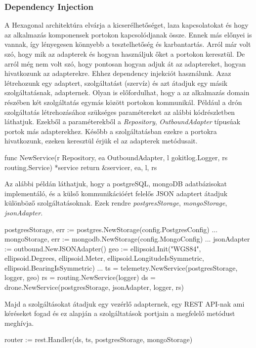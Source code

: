 \subsubsection{Dependency Injection}
A Hexagonal architektúra elvárja a kicserélhetőséget, laza kapcsolatokat és hogy az alkalmazás komponensek portokon kapcsolódjanak össze.
Ennek más előnyei is vannak, így lényegesen könnyebb a tesztelhetőség és karbantartás.
Arról már volt szó, hogy mik az adapterek és hogyan használjuk őket a portokon keresztül.
De arról még nem volt szó, hogy pontosan hogyan adjuk át az adaptereket, hogyan hivatkozunk az adapterekre.
Ehhez dependency injekciót használunk.
Azaz létrehozunk egy adaptert, szolgáltatást (szervíz) és azt átadjuk egy másik szolgáltatásnak, adapternek.
Olyan is előfordulhat, hogy a az alkalmazás domain részében két szolgáltatás egymás között portokon kommunikál.
Például a drón szolgáltatás létrehozásához szükséges paramétereket az alábbi kódrészletben láthatjuk.
Ezekből a paraméterekből a \textit{Repository}, \textit{OutboundAdapter} típusúak portok más adapterekhez.
Később a szolgáltatásban ezekre a portokra hivatkozunk, ezeken keresztül érjük el az adapterek metódusait.

\begin{python}
    func NewService(r Repository, ea OutboundAdapter, l gokitlog.Logger, rs routing.Service) *service {
        return &service{r, ea, l, rs}
    }
\end{python}

Az alábbi példán láthatjuk, hogy a postgreSQL, mongoDB adatbázisokat implementáló, és a külső kommunikációért felelős JSON adaptert átadjuk különböző szolgáltatásoknak.
Ezek rendre \textit{postgresStorage}, \textit{mongoStorage}, \textit{jsonAdapter}.
\begin{python}
    postgresStorage, err := postgres.NewStorage(config.PostgresConfig)
    ...
    mongoStorage, err := mongodb.NewStorage(config.MongoConfig)
    ...
    jsonAdapter := outbound.NewJSONAdapter()
    geo := ellipsoid.Init("WGS84", ellipsoid.Degrees, ellipsoid.Meter, ellipsoid.LongitudeIsSymmetric, ellipsoid.BearingIsSymmetric)
    ...
    ts = telemetry.NewService(postgresStorage, logger, geo)
    rs = routing.NewService(logger)
    ds = drone.NewService(postgresStorage, jsonAdapter, logger, rs)
\end{python}

Majd a szolgáltásokat átadjuk egy vezérlő adapternek, egy REST API-nak ami kéréseket fogad és ez alapján a szolgáltatások portjain a megfelelő metódust meghívja.
\begin{python}
    router := rest.Handler(ds, ts, postgresStorage, mongoStorage)
\end{python}

